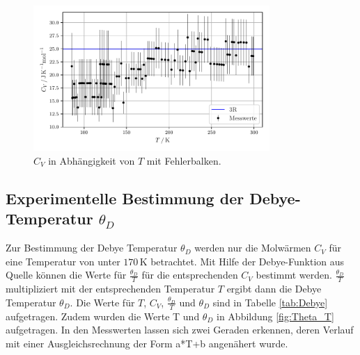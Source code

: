 \begin{figure}[H]
    \centering
    \includegraphics[width=0.8\textwidth]{build/C_V.pdf}
    \caption{$C_V$ in Abhängigkeit von $T$ mit Fehlerbalken.}
    \label{fig:C_V}
\end{figure}

%

\subsection[Experimentelle Bestimmung der Debye-Temperatur]{Experimentelle Bestimmung der Debye-Temperatur $\theta_D$}
\label{sec:debye_temp}

Zur Bestimmung der Debye Temperatur $\theta_D$ werden nur die Molwärmen $C_V$ für eine Temperatur von unter $170 \, \mathrm{K}$ betrachtet. Mit Hilfe der Debye-Funktion aus Quelle \cite{Anleitung} können die Werte für $\frac{\theta_D}{T}$ für die entsprechenden $C_V$ bestimmt werden. $\frac{\theta_D}{T}$ multipliziert mit der entsprechenden Temperatur $T$ ergibt dann die Debye Temperatur $\theta_D$. Die Werte für $T$, $C_V$, $\frac{\theta_D}{T}$ und $\theta_D$ sind in Tabelle \ref{tab:Debye} aufgetragen. Zudem wurden die Werte T und $\theta_D$  in Abbildung \ref{fig:Theta_T} aufgetragen. In den Messwerten lassen sich zwei Geraden erkennen, deren Verlauf mit einer Ausgleichsrechnung der Form a*T+b angenähert wurde.

